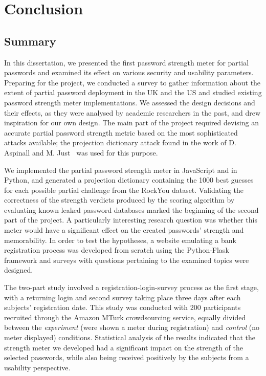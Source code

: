 
\chapter{Conclusion}
\label{cha:conclusion}

  \section{Summary}
    In this dissertation, we presented the first password strength meter for partial passwords and examined its effect on various security and usability parameters. Preparing for the project, we conducted a survey to gather information about the extent of partial password deployment in the UK and the US and studied existing password strength meter implementations. We assessed the design decisions and their effects, as they were analysed by academic researchers in the past, and drew inspiration for our own design. The main part of the project required devising an accurate partial password strength metric based on the most sophisticated attacks available; the projection dictionary attack found in the work of D. Aspinall and M. Just~\cite{part_pass} was used for this purpose.

    We implemented the partial password strength meter in JavaScript and in Python, and generated a projection dictionary containing the 1000 best guesses for each possible partial challenge from the RockYou dataset. Validating the correctness of the strength verdicts produced by the scoring algorithm by evaluating known leaked password databases marked the beginning of the second part of the project. A particularly interesting research question was whether this meter would have a significant effect on the created passwords' strength and memorability. In order to test the hypotheses, a website emulating a bank registration process was developed from scratch using the Python-Flask framework and surveys with questions pertaining to the examined topics were designed.

    The two-part study involved a registration-login-survey process as the first stage, with a returning login and second survey taking place three days after each subjects' registration date. This study was conducted with 200 participants recruited through the Amazon MTurk crowdsourcing service, equally divided between the \emph{experiment} (were shown a meter during registration) and \emph{control} (no meter displayed) conditions. Statistical analysis of the results indicated that the strength meter we developed had a significant impact on the strength of the selected passwords, while also being received positively by the subjects from a usability perspective.


